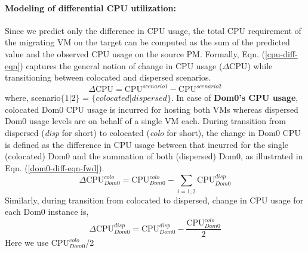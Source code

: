 \paragraph{Modeling of differential CPU utilization: }
Since we predict only the difference in CPU usage, the total
CPU requirement of the migrating VM on the target can be computed
as the sum of the predicted value and the observed CPU usage on
the source PM. Formally, Eqn. (\ref{cpu-diff-eqn}) captures the
general notion of change in CPU usage ($\Delta\mbox{CPU}$)
while transitioning between colocated and dispersed scenarios.
\begin{equation}
	\Delta\mbox{CPU} = \mbox{CPU}^{scenario1} - \mbox{CPU}^{scenario2}
	\label{cpu-diff-eqn}
\end{equation}
where, scenario$\{1|2\}$ = $\{colocated|dispersed\}$.
In case of \textbf{Dom0's CPU usage}, colocated Dom0 CPU usage is incurred
for hosting both VMs whereas dispersed Dom0 usage levels are
on behalf of a single VM each. During transition from dispersed
(\textit{disp} for short) to colocated (\textit{colo} for short),
the change in Dom0 CPU is defined as the difference in CPU usage
between that incurred for the single (colocated) Dom0 and the
summation of both (dispersed) Dom0, as illustrated in
Eqn. (\ref{dom0-diff-eqn-fwd}).
\begin{equation}
	\Delta\mbox{CPU}^{colo}_{Dom0} = \mbox{CPU}^{colo}_{Dom0} - \displaystyle\sum\limits_{i=1,2}\mbox{CPU}^{disp}_{Dom0}
	\label{dom0-diff-eqn-fwd}
\end{equation}
Similarly, during transition from colocated to dispersed, change in
CPU usage for each Dom0 instance is,
\begin{equation}
	\Delta\mbox{CPU}^{disp}_{Dom0} = \mbox{CPU}^{disp}_{Dom0} - \frac{\mbox{CPU}^{colo}_{Dom0}}{2} %
	\label{dom0-diff-eqn-rev}
\end{equation}
Here we use %
$\mbox{CPU}^{colo}_{Dom0}$/2
